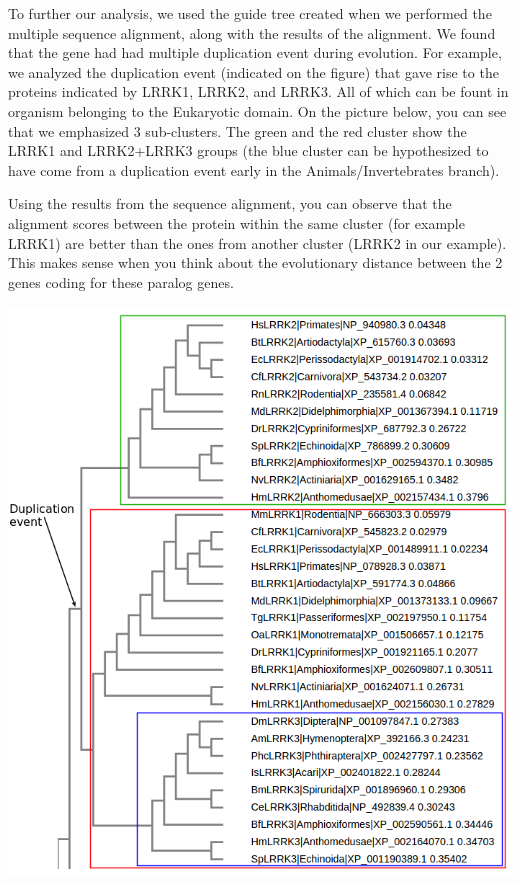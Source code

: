 \documentclass[11pt, a4paper,titlepage]{article}
\begin{document}
To further our analysis, we used the guide tree created when we
performed the multiple sequence alignment, along with the results of
the alignment. We found that the gene had had multiple duplication
event during evolution. For example, we analyzed the duplication event
(indicated on the figure) that gave rise to the proteins indicated by
LRRK1, LRRK2, and LRRK3. All of which can be fount in organism
belonging to the Eukaryotic domain. On the picture below, you can see
that we emphasized 3 sub-clusters. The green and the red cluster show
the LRRK1 and LRRK2+LRRK3 groups (the blue cluster can be hypothesized
to have come from a duplication event early in the
Animals/Invertebrates branch).

Using the results from the sequence alignment, you can observe that
the alignment scores between the protein within the same cluster (for
example LRRK1) are better than the ones from another cluster (LRRK2 in
our example). This makes sense when you think about the evolutionary
distance between the 2 genes coding for these paralog genes.

\includegraphics[width=18cm]{./Figures/5e.png}



\end{document}
